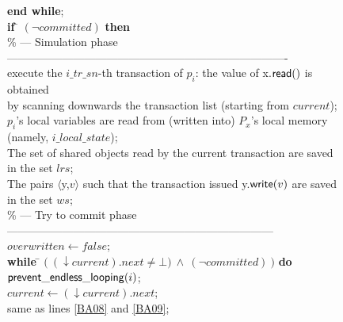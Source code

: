\begin{figure}[h!]
{{\begin{minipage}[t]{150mm}
\begin{tabbing}
 \>     {\bf end while}; \\


 \> {\bf if} \= $(\neg committed)$  {\bf then}\\

\>\> \% --- Simulation phase  ----------------------------------------------------------------------------\\


 \>  \>
   execute the $i\_tr\_sn$-th transaction of $p_i$:  the value of
   {\sc x}.${\sf read}()$  is obtained \\
                
 \>  \>
       by scanning downwards the transaction list 
       (starting from   $current$);  \\ %

 \> \> $p_i$'s local variables are read from (written into) 
             $P_x$'s local memory (namely,   $i\_local\_state$);\\  


\>\> The set of shared objects read by the current 
              transaction  are saved in  the set $\mathit{lrs}$;\\ 


\>\>  The  pairs $\langle${\sc y},$v\rangle$ 
               such that the transaction issued  {\sc y}.${\sf write}(v)$
               are saved in the set $ws$; \\



\>\> \% --- Try to  commit phase  ------------------------------------------------------------------------ \\


 \>\> $overwritten \leftarrow \mathit{false}$; \\ 


 \> \>
      {\bf while} \= $\big(~(\downarrow current).next \neq \bot)
      ~\wedge~ (\neg committed)~\big)$   %
        {\bf do}\\


 \> \>\>   ${\sf prevent\_endless\_looping}(i)$;\\ 
 
 \> \>\>  $current \leftarrow (\downarrow current).next$;\\

 \> \>\> same as lines \ref{BA08} and  \ref{BA09};\\



\end{tabbing}
\end{minipage}}}
\end{figure}
